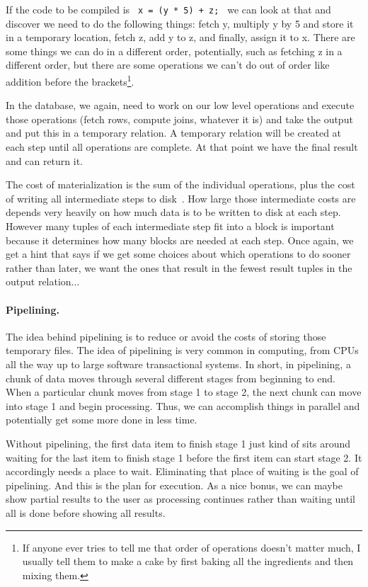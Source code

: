 If the code to be compiled is \texttt{ x = (y * 5) + z; } we can look at that and discover we need to do the following things: fetch y, multiply y by 5 and store it in a temporary location, fetch z, add y to z, and finally, assign it to x. There are some things we can do in a different order, potentially, such as fetching z in a different order, but there are some operations we can't do out of order like addition before the brackets\footnote{If anyone ever tries to tell me that order of operations doesn't matter much, I usually tell them to make a cake by first baking all the ingredients and then mixing them.}. 

In the database, we again, need to work on our low level operations and execute those operations (fetch rows, compute joins, whatever it is) and take the output and put this in a temporary relation. A temporary relation will be created at each step until all operations are complete. At that point we have the final result and can return it. 

The cost of materialization is the sum of the individual operations, plus the cost of writing all intermediate steps to disk~\cite{dsc}. How large those intermediate costs are depends very heavily on how much data is to be written to disk at each step. However many tuples of each intermediate step fit into a block is important because it determines how many blocks are needed at each step. Once again, we get a hint that says if we get some choices about which operations to do sooner rather than later, we want the ones that result in the fewest result tuples in the output relation...

\paragraph{Pipelining.}
The idea behind pipelining is to reduce or avoid the costs of storing those temporary files. The idea of pipelining is very common in computing, from CPUs all the way up to large software transactional systems. In short, in pipelining, a chunk of data moves through several different stages from beginning to end. When a particular chunk moves from stage 1 to stage 2, the next chunk can move into stage 1 and begin processing. Thus, we can accomplish things in parallel and potentially get some more done in less time.

Without pipelining, the first data item to finish stage 1 just kind of sits around waiting for the last item to finish stage 1 before the first item can start stage 2. It accordingly needs a place to wait. Eliminating that place of waiting is the goal of pipelining. And this is the plan for execution. As a nice bonus, we can maybe show partial results to the user as processing continues rather than waiting until all is done before showing all results. 

